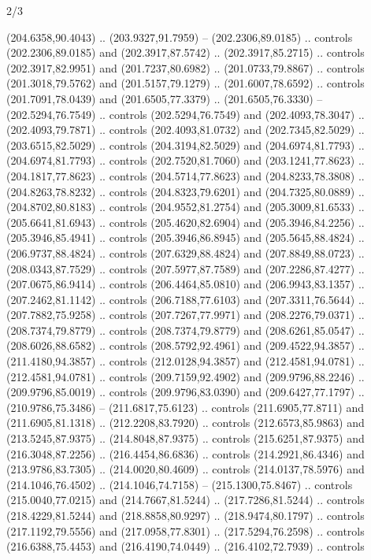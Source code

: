 \begin{flagdescription}{2/3}
\begin{scope}[xshift=0.5\flaglength,yshift=0.5\flagwidth,scale=\flagwidth/180]
\begin{scope}[y=0.8pt, x=0.8pt, yscale=-1,shift={(-168.75,-108.75)}]
  (204.6358,90.4043) .. (203.9327,91.7959) -- (202.2306,89.0185) .. controls
  (202.2306,89.0185) and (202.3917,87.5742) .. (202.3917,85.2715) .. controls
  (202.3917,82.9951) and (201.7237,80.6982) .. (201.0733,79.8867) .. controls
  (201.3018,79.5762) and (201.5157,79.1279) .. (201.6007,78.6592) .. controls
  (201.7091,78.0439) and (201.6505,77.3379) .. (201.6505,76.3330) --
  (202.5294,76.7549) .. controls (202.5294,76.7549) and (202.4093,78.3047) ..
  (202.4093,79.7871) .. controls (202.4093,81.0732) and (202.7345,82.5029) ..
  (203.6515,82.5029) .. controls (204.3194,82.5029) and (204.6974,81.7793) ..
  (204.6974,81.7793) .. controls (202.7520,81.7060) and (203.1241,77.8623) ..
  (204.1817,77.8623) .. controls (204.5714,77.8623) and (204.8233,78.3808) ..
  (204.8263,78.8232) .. controls (204.8323,79.6201) and (204.7325,80.0889) ..
  (204.8702,80.8183) .. controls (204.9552,81.2754) and (205.3009,81.6533) ..
  (205.6641,81.6943) .. controls (205.4620,82.6904) and (205.3946,84.2256) ..
  (205.3946,85.4941) .. controls (205.3946,86.8945) and (205.5645,88.4824) ..
  (206.9737,88.4824) .. controls (207.6329,88.4824) and (207.8849,88.0723) ..
  (208.0343,87.7529) .. controls (207.5977,87.7589) and (207.2286,87.4277) ..
  (207.0675,86.9414) .. controls (206.4464,85.0810) and (206.9943,83.1357) ..
  (207.2462,81.1142) .. controls (206.7188,77.6103) and (207.3311,76.5644) ..
  (207.7882,75.9258) .. controls (207.7267,77.9971) and (208.2276,79.0371) ..
  (208.7374,79.8779) .. controls (208.7374,79.8779) and (208.6261,85.0547) ..
  (208.6026,88.6582) .. controls (208.5792,92.4961) and (209.4522,94.3857) ..
  (211.4180,94.3857) .. controls (212.0128,94.3857) and (212.4581,94.0781) ..
  (212.4581,94.0781) .. controls (209.7159,92.4902) and (209.9796,88.2246) ..
  (209.9796,85.0019) .. controls (209.9796,83.0390) and (209.6427,77.1797) ..
  (210.9786,75.3486) -- (211.6817,75.6123) .. controls (211.6905,77.8711) and
  (211.6905,81.1318) .. (212.2208,83.7920) .. controls (212.6573,85.9863) and
  (213.5245,87.9375) .. (214.8048,87.9375) .. controls (215.6251,87.9375) and
  (216.3048,87.2256) .. (216.4454,86.6836) .. controls (214.2921,86.4346) and
  (213.9786,83.7305) .. (214.0020,80.4609) .. controls (214.0137,78.5976) and
  (214.1046,76.4502) .. (214.1046,74.7158) -- (215.1300,75.8467) .. controls
  (215.0040,77.0215) and (214.7667,81.5244) .. (217.7286,81.5244) .. controls
  (218.4229,81.5244) and (218.8858,80.9297) .. (218.9474,80.1797) .. controls
  (217.1192,79.5556) and (217.0958,77.8301) .. (217.5294,76.2598) .. controls
  (216.6388,75.4453) and (216.4190,74.0449) .. (216.4102,72.7939) .. controls

\end{scope}
\end{scope}
\end{flagdescription}
